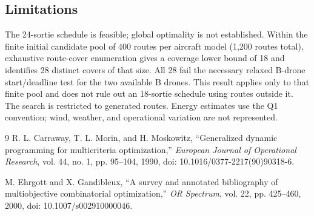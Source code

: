 \documentclass[11pt,a4paper]{article}
\begin{document}
\begin{samepage}
\subsection{Limitations}
The 24-sortie schedule is feasible; global optimality is not established. Within the finite initial candidate pool of 400 routes per aircraft model (1,200 routes total), exhaustive route-cover enumeration gives a coverage lower bound of 18 and identifies 28 distinct covers of that size. All 28 fail the necessary relaxed B-drone start/deadline test for the two available B drones. This result applies only to that finite pool and does not rule out an 18-sortie schedule using routes outside it. The search is restricted to generated routes. Energy estimates use the Q1 convention; wind, weather, and operational variation are not represented.
\end{samepage}

\begin{thebibliography}{9}
R. L. Carraway, T. L. Morin, and H. Moskowitz, ``Generalized dynamic programming for multicriteria optimization,'' \textit{European Journal of Operational Research}, vol. 44, no. 1, pp. 95--104, 1990, doi: 10.1016/0377-2217(90)90318-6.

M. Ehrgott and X. Gandibleux, ``A survey and annotated bibliography of multiobjective combinatorial optimization,'' \textit{OR Spectrum}, vol. 22, pp. 425--460, 2000, doi: 10.1007/s002910000046.
\end{thebibliography}
\end{document}
